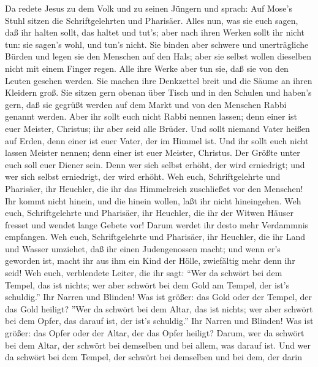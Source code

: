  Da redete Jesus zu dem Volk und zu seinen Jüngern
 und sprach: Auf Mose's Stuhl sitzen die Schriftgelehrten
und Pharisäer.  Alles nun, was sie euch sagen, daß ihr
halten sollt, das haltet und tut's; aber nach ihren Werken sollt ihr
nicht tun: sie sagen's wohl, und tun's nicht.  Sie binden
aber schwere und unerträgliche Bürden und legen sie den Menschen auf den
Hals; aber sie selbst wollen dieselben nicht mit einem Finger regen.
 Alle ihre Werke aber tun sie, daß sie von den Leuten
gesehen werden. Sie machen ihre Denkzettel breit und die Säume an ihren
Kleidern groß.  Sie sitzen gern obenan über Tisch und in den
Schulen  und haben's gern, daß sie gegrüßt werden auf dem
Markt und von den Menschen Rabbi genannt werden.  Aber ihr
sollt euch nicht Rabbi nennen lassen; denn einer ist euer Meister,
Christus; ihr aber seid alle Brüder.  Und sollt niemand
Vater heißen auf Erden, denn einer ist euer Vater, der im Himmel ist.
 Und ihr sollt euch nicht lassen Meister nennen; denn einer
ist euer Meister, Christus.  Der Größte unter euch soll
euer Diener sein.  Denn wer sich selbst erhöht, der wird
erniedrigt; und wer sich selbst erniedrigt, der wird erhöht.
 Weh euch, Schriftgelehrte und Pharisäer, ihr Heuchler, die
ihr das Himmelreich zuschließet vor den Menschen! Ihr kommt nicht
hinein, und die hinein wollen, laßt ihr nicht hineingehen. 
Weh euch, Schriftgelehrte und Pharisäer, ihr Heuchler, die ihr der
Witwen Häuser fresset und wendet lange Gebete vor! Darum werdet ihr
desto mehr Verdammnis empfangen.  Weh euch, Schriftgelehrte
und Pharisäer, ihr Heuchler, die ihr Land und Wasser umziehet, daß ihr
einen Judengenossen macht; und wenn er's geworden ist, macht ihr aus ihm
ein Kind der Hölle, zwiefältig mehr denn ihr seid!  Weh
euch, verblendete Leiter, die ihr sagt: ``Wer da schwört bei dem Tempel,
das ist nichts; wer aber schwört bei dem Gold am Tempel, der ist's
schuldig.''  Ihr Narren und Blinden! Was ist größer: das
Gold oder der Tempel, der das Gold heiligt?  ''Wer da
schwört bei dem Altar, das ist nichts; wer aber schwört bei dem Opfer,
das darauf ist, der ist's schuldig.''  Ihr Narren und
Blinden! Was ist größer: das Opfer oder der Altar, der das Opfer
heiligt?  Darum, wer da schwört bei dem Altar, der schwört
bei demselben und bei allem, was darauf ist.  Und wer da
schwört bei dem Tempel, der schwört bei demselben und bei dem, der darin
